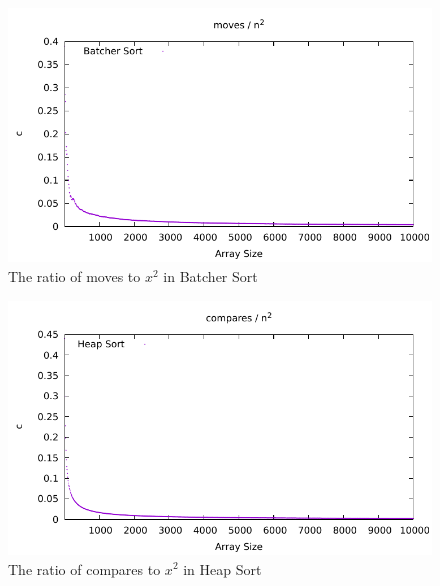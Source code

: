 \documentclass[12pt]{article}
\begin{document}
\begin{figure}[H]\begin{centering}
\includegraphics{plots/nn-moves-batcher.pdf}\caption{The ratio of moves to $x^2$ in Batcher Sort}
\end{centering}\end{figure}
\begin{figure}[H]\begin{centering}
\includegraphics{plots/nn-compares-heap.pdf}\caption{The ratio of compares to $x^2$ in Heap Sort}
\end{centering}\end{figure}
\end{document}
